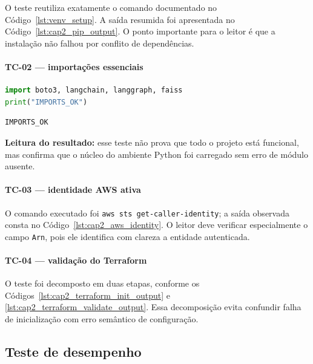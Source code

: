 O teste reutiliza exatamente o comando documentado no
C\'odigo~\ref{lst:venv_setup}. A sa\'ida resumida foi apresentada no
C\'odigo~\ref{lst:cap2_pip_output}. O ponto importante para o leitor \'e
que a instala\c{c}\~ao n\~ao falhou por conflito de depend\^encias.

\paragraph{TC-02 --- importa\c{c}\~oes essenciais}

\begin{lstlisting}[language=Python,
  caption={TC-02 --- verifica\c{c}\~ao m\'inima de importa\c{c}\~oes do ambiente.},
  label={lst:cap2_import_check}]
import boto3, langchain, langgraph, faiss
print("IMPORTS_OK")
\end{lstlisting}

\begin{lstlisting}[language=bash,
  caption={TC-02 --- sa\'ida da verifica\c{c}\~ao de importa\c{c}\~oes.},
  label={lst:cap2_import_output}]
IMPORTS_OK
\end{lstlisting}

\noindent\textbf{Leitura do resultado:} esse teste n\~ao prova que todo
o projeto est\'a funcional, mas confirma que o n\'ucleo do ambiente
Python foi carregado sem erro de m\'odulo ausente.

\paragraph{TC-03 --- identidade AWS ativa}

O comando executado foi \texttt{aws sts get-caller-identity}; a sa\'ida
observada consta no C\'odigo~\ref{lst:cap2_aws_identity}. O leitor deve
verificar especialmente o campo \texttt{Arn}, pois ele identifica com
clareza a entidade autenticada.

\paragraph{TC-04 --- valida\c{c}\~ao do Terraform}

O teste foi decomposto em duas etapas, conforme os
C\'odigos~\ref{lst:cap2_terraform_init_output} e
\ref{lst:cap2_terraform_validate_output}. Essa decomposi\c{c}\~ao evita
confundir falha de inicializa\c{c}\~ao com erro sem\^antico de
configura\c{c}\~ao.

\subsection{Teste de desempenho}

